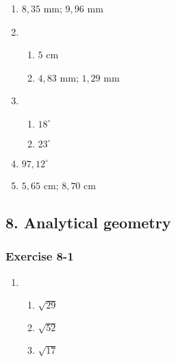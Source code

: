 {\begin{multicols}{3}
\begin{enumerate}[noitemsep, label=\textbf{\arabic*}. ]
\item $8,35$ mm; $9,96$ mm%
\item %
\begin{enumerate}[noitemsep, label=\textbf{(\alph*)} ]
\item $5$ cm%
\item $4,83$ mm; $1,29$ mm%
\end{enumerate} 
\item %
\begin{enumerate}[noitemsep, label=\textbf{(\alph*)} ] 
\item $18^{\circ}$%
\item $23^{\circ}$%
\end{enumerate} 
\item $97,12^{\circ}$%
\item $5,65$ cm; $8,70$ cm%

\end{enumerate}
\end{multicols}

\subsection* {8. Analytical geometry}
\begin{multicols}{3}
\subsubsection*{Exercise 8-1} %
\begin{enumerate}[label=\textbf{\arabic*}.]
\item %
 \begin{enumerate}[noitemsep, label=\textbf{(\alph*)} ] 
\item $\sqrt{29}$%
\item $\sqrt{52}$%
\item $\sqrt{17}$%
\end{enumerate}


\end{enumerate}
\end{multicols}}

